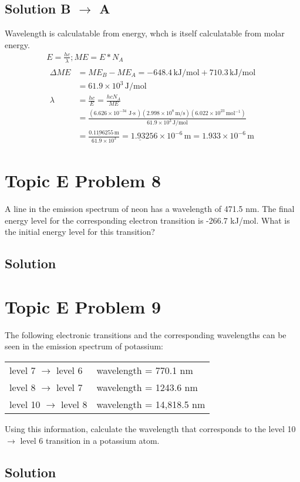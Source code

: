 \documentclass[10pt]{article}
\newcommand{\E}[1]{\times 10^{#1}}
\newcommand{\U}[1]{\underline{#1}}
\begin{document}
        \subsection{Solution B $\to$ A}
            Wavelength is calculatable from energy, whch is itself calculatable from molar energy.
            \begin{gather}
                E   =   \frac{hc}{\lambda}; ME  =   E * N_A\\
                \begin{align}
                    \Delta ME   &=  ME_B - ME_A
                        =   -648.4\,\unit{\kilo\joule/\mole} + 710.3\,\unit{\kilo\joule/\mole}\\
                        &=  61.9\E{3}\,\unit{\joule/\mole}\\
                    \lambda &=  \frac{hc}{E}
                        =   \frac{hcN_A}{ME}\\
                        &=  \frac{(6.626\E{-34}\,\unit{\joule\cdot\second})(2.998\E{8}\,\unit{\meter/\second})(6.022\E{23}\,\unit{\mol^{-1}})}{61.9\E{3}\,\unit{\joule/\mole}}\\
                        &=  \frac{0.\U{1196}255\,\unit{\meter}}{61.9\E{3}}
                        =   \U{1.932}56\E{-6}\,\unit{\meter}
                        =   \boxed{1.933\E{-6}\,\unit{\meter}}
                \end{align}
            \end{gather}


    \pagebreak
    \section{Topic E Problem 8}
        A line in the emission spectrum of neon has a wavelength of 471.5 nm. 
        The final energy level for the corresponding electron transition is -266.7 kJ/mol. 
        What is the initial energy level for this transition?

        \subsection{Solution}


    \pagebreak
    \section{Topic E Problem 9}
        The following electronic transitions and the corresponding wavelengths can be seen in the emission spectrum of potassium:
        \begin{center}
            \begin{tabular}{l l}
                level 7 $\rightarrow$ level 6   &wavelength = 770.1 nm\\
                level 8 $\rightarrow$ level 7   &wavelength = 1243.6 nm\\
                level 10 $\rightarrow$ level 8  &wavelength = 14,818.5 nm
            \end{tabular}
        \end{center}
        Using this information, calculate the wavelength that corresponds to the level 10 $\rightarrow$ level 6 transition in a potassium atom.

        \subsection{Solution}

    \pagebreak
    \tableofcontents
\end{document}
